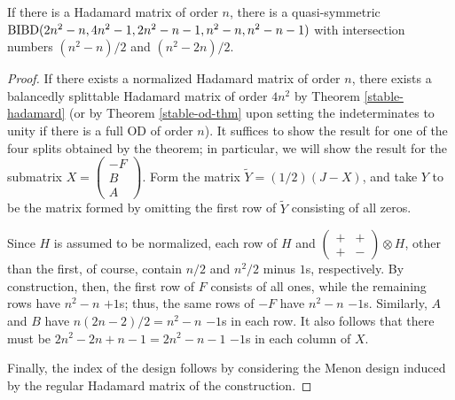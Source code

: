 \documentclass[../../../main]{subfiles}
\begin{document}
\begin{prop}
 If there is a Hadamard matrix of order $n$, there is a quasi-symmetric $\text{BIBD}(2n^2-n,4n^2-1,2n^2-n-1,n^2-n,n^2-n-1)$ with intersection numbers $(n^2-n)/2$ and $(n^2-2n)/2$.
\end{prop}

\begin{proof}
 If there exists a normalized Hadamard matrix of order $n$, there exists a
 balancedly splittable Hadamard matrix of order $4n^2$ by Theorem
 \ref{stable-hadamard} (or by Theorem \ref{stable-od-thm} upon setting the
 indeterminates to unity if there is a full OD of order $n$). It suffices to
 show the result for one of the four splits obtained by the theorem; in
 particular, we will show the result for the submatrix
 $X=\left(\begin{smallmatrix} -F \\ B \\ A \end{smallmatrix}\right)$. Form the
 matrix $\tilde Y = (1/2)(J-X)$, and take $Y$ to be the matrix formed by
 omitting the first row of $\tilde Y$ consisting of all zeros. 
 
 Since $H$ is assumed to be normalized, each row of $H$ and
 $\left(\begin{smallmatrix}+&+\\+&-\end{smallmatrix}\right) \otimes H$, other
 than the first, of course, contain $n/2$ and $n^2/2$ minus $1$s, respectively. By
 construction, then, the first row of $F$ consists of all ones, while the
 remaining rows have $n^2-n$ $+1$s; thus, the same rows of $-F$ have $n^2-n$
 $-1$s. Similarly, $A$ and $B$ have $n(2n-2)/2 = n^2-n$ $-1$s in each row. It
 also follows that there must be $2n^2-2n+n-1=2n^2-n-1$ $-1$s in each column of
 $X$. 
 
 Finally, the index of the design follows by considering the Menon
 design induced by the regular Hadamard matrix of the 
 construction. 
 

\end{proof}
\end{document}
